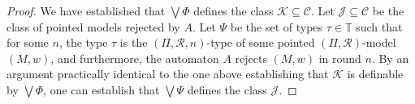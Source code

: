 \documentclass[copyright,creativecommons]{eptcs}
\newtheorem{lemma}[theorem]{Lemma}
\begin{document}
\begin{proof}
We have established that $\bigvee\Phi$ defines the class $\mathcal{K}\subseteq\mathcal{C}$.
Let $\mathcal{J}\subseteq\mathcal{C}$ be the class of pointed models
rejected by $A$.
Let $\Psi$ be the set of types $\tau\in\mathbb{T}$ such
that for some $n$, the type $\tau$ is the $(\Pi,\mathcal{R},n)$-type of 
some pointed $(\Pi,\mathcal{R})$-model $(M,w)$, and furthermore, the automaton $A$
rejects $(M,w)$ in round $n$. 
By an argument practically identical to the one above establishing that $\mathcal{K}$
is definable by $\bigvee\Phi$, one can establish that $\bigvee\Psi$
defines the class $\mathcal{J}$.
\begin{comment}
If $A$ defines a local algorithm in some class $\mathcal{H}\subseteq\mathcal{C}$,
then there exists some $l\in\mathbb{N}$ such that each pointed model in $\mathcal{H}$ is either accepted or
rejected in some round $l'\leq l$. Let $\mathcal{M}\subseteq\mathcal{H}$ be the class of
pointed models accepted by $A$ in $\mathcal{H}$.
Define $\Gamma$ to the set of exactly all types $\tau\in\mathcal{T}$ such that $\tau$ is the $(\Pi,\mathcal{R},n)$-type
of some $(M',w')\in\mathcal{H}$ accepted in round $n$. The set $\Gamma$ is finite.
An argument practically identical to the argument
discussed above shows that
$\bigvee\Gamma$ defines $\mathcal{M}$ with respect to $\mathcal{H}$. 
Since $\Gamma$ is finite, $\bigvee\Gamma$ is a formula of $\mathrm{ML}(\Pi,\mathcal{R})$.
\end{comment}
\end{proof}




\begin{comment}
\begin{lemma}\label{formulatoalgorithm}
Let $\Pi$ and $\mathcal{R}$ be finite sets of unary
and binary relation symbols.
Let $\mathcal{H}$ be any class of pointed $(\Pi,\mathcal{R})$-models.
Let $\varphi$ be a formula of $\mathrm{ML}(\Pi,\mathcal{R})$ that defines a class $\mathcal{K}\subseteq\mathcal{H}$
of pointed models with respect to $\mathcal{H}$.
Then there is a $(\Pi,\mathcal{R})$-automaton $A$ that accepts $\mathcal{K}$ in $\mathcal{H}$.
Furthermore, $A$ specifies a local algorithm in $\mathcal{H}$.
\end{lemma}
\begin{proof}
As discussed in the beginning of the current section, each $(\Pi,\mathcal{R})$-formula $\psi$ is equivalent to
the disjunction of $(\Pi,\mathcal{R},\mathit{md}(\psi))$-types $\tau$ such that $\tau\models\psi$.
Let $T$ be the set of $(\Pi,\mathcal{R},\mathit{md}(\varphi))$-types $\tau$ such that $\tau\models\varphi$.
Thus the type automaton $A'$ whose set of accepting states is $T$, accepts $\mathcal{K}$ in $\mathcal{H}$.
Now notice that type automata have the property that no state can be visited twice.
Hence, since $T$ is a finite set of states of $A'$, and since $A'$ is a type automaton,
we can transform $A'$ into an automaton $A$ that specifies a local algorithm in $\mathcal{H}$
and accepts $\mathcal{K}$ in $\mathcal{H}$.
\end{proof}
\end{comment}
\end{document}
